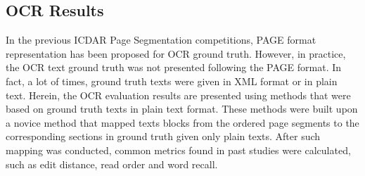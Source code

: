 \documentclass[letterpaper]{article} %
\begin{document}
\subsection{OCR Results}
In the previous ICDAR Page Segmentation competitions, PAGE format representation \cite{DBLP:conf/icdar/ClausnerAP17}  has been proposed for OCR ground truth. However, in practice, the OCR text ground truth was not presented following the PAGE format. In fact, a lot of times, ground truth texts were given in XML format or in plain text. Herein, the OCR evaluation results are presented using methods that were based on ground truth texts in plain text format. These methods were built upon a novice method that mapped texts blocks from the ordered page segments to the corresponding sections in ground truth given only plain texts. After such mapping was conducted, common metrics found in past studies were calculated, such as edit distance, read order and word recall.

\end{document}
